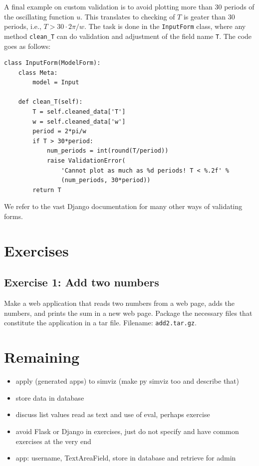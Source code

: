 \documentclass[%
oneside,                 %
final,                   %
10pt]{article}
\newenvironment{exercise}{}{}
\newcounter{exerno}
\begin{document}
A final example on custom validation is to avoid plotting more
than 30 periods of the oscillating function $u$. This translates
to checking of $T$ is geater
than 30 periods, i.e., $T>30\cdot 2\pi/w$. The task is done in
the \Verb!InputForm! class, where any method \Verb!clean_T! can do
validation and adjustment of the field name \Verb!T!. The code goes
as follows:

\begin{Verbatim}[numbers=none,fontsize=\fontsize{9pt}{9pt},baselinestretch=0.85]
class InputForm(ModelForm):
    class Meta:
        model = Input

    def clean_T(self):
        T = self.cleaned_data['T']
        w = self.cleaned_data['w']
        period = 2*pi/w
        if T > 30*period:
            num_periods = int(round(T/period))
            raise ValidationError(
                'Cannot plot as much as %d periods! T < %.2f' %
                (num_periods, 30*period))
        return T
\end{Verbatim}
We refer to the vast Django documentation for many other ways of
validating forms.

\section{Exercises}



\begin{exercise}

\subsection*{Exercise 1: Add two numbers}
\label{wf:exer:add2}

Make a web application that reads two numbers from a web page,
adds the numbers, and prints the sum in a new web page.
Package the necessary files that constitute the application
in a tar file.
Filename: \Verb!add2.tar.gz!.

\end{exercise}


\section{Remaining}

\begin{itemize}
 \item apply (generated apps) to simviz (make py simviz too and describe that)

 \item store data in database

 \item discuss list values read as text and use of eval, perhaps exercise

 \item avoid Flask or Django in exercises, just do not specify and have
   common exercises at the very end

 \item app: username, TextAreaField, store in database and retrieve for admin
\end{itemize}

\noindent



\printindex
\end{document}
